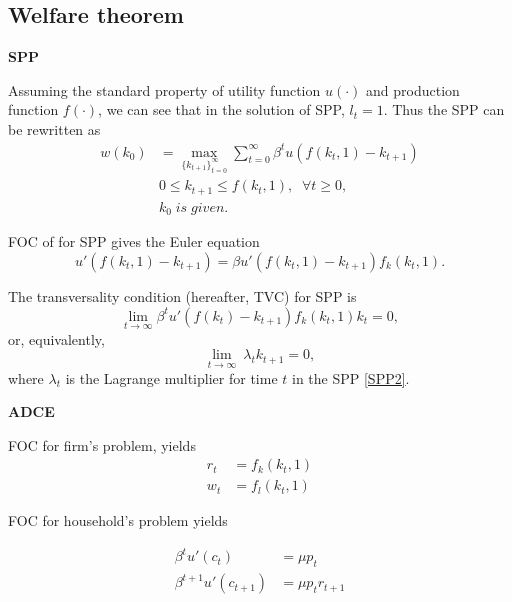 \documentclass[12pt,notitlepage]{article}%
\numberwithin{equation}{section}
\begin{document}
		\subsection{Welfare theorem}
			\textbf{SPP}
			
			Assuming the standard property of utility function $u(\cdot)$ and production function $f(\cdot)$, we can see that in the solution of SPP, $l_t=1$. Thus the SPP can be rewritten as
			\begin{equation}\label{SPP2}
			\begin{split}
			w( k_0)&=\max_{\{ k_{t+1} \}_{t=0}^{\infty}}
			\sum_{t=0}^{\infty}\beta^tu(f(k_t,1)-k_{t+1})\\
			&0\leq k_{t+1}\leq f(k_t,1),  \;\;\forall t\geq 0,\\
			&k_0 \;is\; given. 
			\end{split}
			\end{equation}
			
			FOC of  for SPP  gives the Euler equation
			\begin{equation}
			u'(f(k_t,1)-k_{t+1})=\beta u'(f(k_t,1)-k_{t+1})f_k(k_t,1). 
			\end{equation}
			
			The transversality condition (hereafter, TVC) for SPP is
			\begin{equation}\label{EularSPP}
			\lim_{t\to \infty}\beta^t u'(f(k_t)-k_{t+1})f_k(k_t,1)k_t=0,
			\end{equation}
			or, equivalently, 
			\begin{equation}\label{TVCspp}
			\lim_{t\to \infty}\ \lambda_tk_{t+1}=0,
			\end{equation}
			where  $\lambda_t$ is the Lagrange multiplier for time $t$ in the  SPP \ref{SPP2}. 
			
			\textbf{ADCE}
			
			FOC for firm's problem, yields
			\begin{equation*}
			\begin{split}
					r_t&=f_k(k_t,1)\\
					w_t&=f_l(k_t,1)
			\end{split}
			\end{equation*}
			
			FOC for household's problem yields
			
			\begin{equation*}
			\begin{split}
			\beta^tu'(c_t)&=\mu p_t\\
			\beta^{t+1}u'(c_{t+1})&=\mu p_t r_{t+1}
			\end{split}
			\end{equation*}
			
\end{document}
